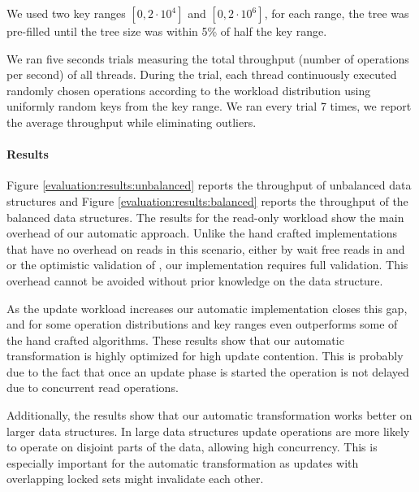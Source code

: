 We used two key ranges $[0,2\cdot10^4]$ and $[0,2\cdot10^6]$,
for each range, the tree was pre-filled until the tree size was 
within 5\% of half the key range.   

We ran five seconds trials measuring the total throughput
(number of operations per second) of all threads.
During the trial, each thread continuously executed randomly
chosen operations according to the workload distribution 
using uniformly random keys from the key range.  
We ran every trial 7 times, we report the average throughput
while eliminating outliers.

\paragraph{Results} Figure \ref{evaluation:results:unbalanced} 
reports the throughput of unbalanced data structures and Figure 
\ref{evaluation:results:balanced} reports
the throughput of the balanced data structures. 
The results for the read-only workload show the main overhead
of our automatic approach. Unlike the hand crafted implementations
that have no overhead on reads in this scenario, either by wait free reads in
\danaTree and \danaAVL or the optimistic validation of \bronson, 
our implementation requires full \readSet validation.
This overhead cannot be avoided without prior knowledge on the
data structure.
 
As the update workload increases our automatic implementation 
closes this gap, and for some operation distributions and 
key ranges even outperforms some of the hand crafted algorithms.
These results show that our automatic transformation is highly optimized for
high update contention. This is probably due to the fact that once
an update phase is started the operation is not delayed due to concurrent 
read operations. 

Additionally, the results show that our automatic transformation 
works better on larger data structures. In large data structures 
update operations are more likely to operate on disjoint parts of 
the data, allowing high concurrency. This is especially important 
for the automatic transformation as updates  with overlapping 
locked sets might invalidate each other.  
 


